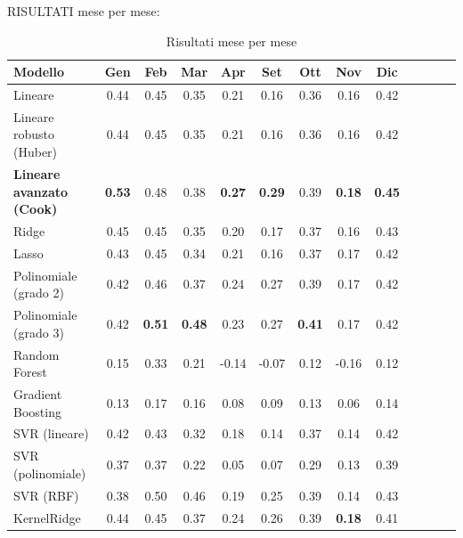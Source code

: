 RISULTATI mese per mese:

\begin{table}[H]
    \footnotesize
    \centering
    \def\arraystretch{0.9}
    \begin{tabular}{|l|c|c|c|c|c|c|c|c|c|c|c|c|}
    \hline
        \textbf{Modello} & \textbf{Gen} & \textbf{Feb} & \textbf{Mar} & \textbf{Apr} & \textbf{Set} & \textbf{Ott} & \textbf{Nov} & \textbf{Dic} \\ \hline
        Lineare & 0.44 & 0.45 & 0.35 & 0.21 & 0.16 & 0.36 & 0.16 & 0.42 \\ \hline
        Lineare robusto (Huber) & 0.44 & 0.45 & 0.35 & 0.21 & 0.16 & 0.36 & 0.16 & 0.42 \\ \hline
        \textbf{Lineare avanzato (Cook)} & \textbf{0.53} & 0.48 & 0.38 & \textbf{0.27} & \textbf{0.29} & 0.39 & \textbf{0.18} & \textbf{0.45} \\ \hline
        Ridge & 0.45 & 0.45 & 0.35 & 0.20 & 0.17 & 0.37 & 0.16 & 0.43 \\ \hline
        Lasso & 0.43 & 0.45 & 0.34 & 0.21 & 0.16 & 0.37 & 0.17 & 0.42 \\ \hline
        Polinomiale (grado 2) & 0.42 & 0.46 & 0.37 & 0.24 & 0.27 & 0.39 & 0.17 & 0.42 \\ \hline
        Polinomiale (grado 3) & 0.42 & \textbf{0.51} & \textbf{0.48} & 0.23 & 0.27 & \textbf{0.41} & 0.17 & 0.42 \\ \hline
        Random Forest & 0.15 & 0.33 & 0.21 & -0.14 & -0.07 & 0.12 & -0.16 & 0.12 \\ \hline
        Gradient Boosting & 0.13 & 0.17 & 0.16 & 0.08 & 0.09 & 0.13 & 0.06 & 0.14 \\ \hline
        SVR (lineare) & 0.42 & 0.43 & 0.32 & 0.18 & 0.14 & 0.37 & 0.14 & 0.42 \\ \hline
        SVR (polinomiale) & 0.37 & 0.37 & 0.22 & 0.05 & 0.07 & 0.29 & 0.13 & 0.39 \\ \hline
        SVR (RBF) & 0.38 & 0.50 & 0.46 & 0.19 & 0.25 & 0.39 & 0.14 & 0.43 \\ \hline
        KernelRidge & 0.44 & 0.45 & 0.37 & 0.24 & 0.26 & 0.39 & \textbf{0.18} & 0.41 \\ \hline
    \end{tabular}
    \caption{Risultati mese per mese}
    \label{fig:risultati-no2-mese}
\end{table}

